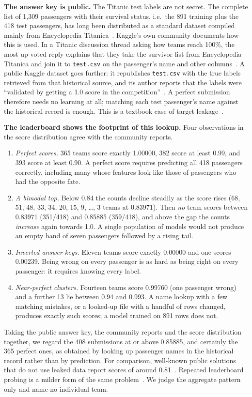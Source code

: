\documentclass[10pt,twocolumn,letterpaper]{article}
\begin{document}
\textbf{The answer key is public.} The Titanic test labels are not secret. The complete list of 1{,}309 passengers with their survival status, i.e.\ the 891 training plus the 418 test passengers, has long been distributed as a standard dataset compiled mainly from Encyclopedia Titanica~\cite{openml,et}. Kaggle's own community documents how this is used. In a Titanic discussion thread asking how teams reach 100\%, the most up-voted reply explains that they take the survivor list from Encyclopedia Titanica and join it to \texttt{test.csv} on the passenger's name and other columns~\cite{kagglediscuss}. A public Kaggle dataset goes further: it republishes \texttt{test.csv} with the true labels retrieved from that historical source, and its author reports that the labels were ``validated by getting a 1.0 score in the competition''~\cite{howe}. A perfect submission therefore needs no learning at all; matching each test passenger's name against the historical record is enough. This is a textbook case of target leakage~\cite{kaufman2012}.

\textbf{The leaderboard shows the footprint of this lookup.} Four observations in the score distribution agree with the community reports.
\begin{enumerate}
\item \emph{Perfect scores.} 365 teams score exactly 1.00000, 382 score at least 0.99, and 393 score at least 0.90. A perfect score requires predicting all 418 passengers correctly, including many whose features look like those of passengers who had the opposite fate.
\item \emph{A bimodal top.} Below 0.84 the counts decline steadily as the score rises (68, 51, 48, 33, 34, 20, 15, 9, \dots, 3 teams at 0.83971). Then \emph{no} team scores between 0.83971 (351/418) and 0.85885 (359/418), and above the gap the counts \emph{increase} again towards 1.0. A single population of models would not produce an empty band of seven passengers followed by a rising tail.
\item \emph{Inverted answer keys.} Eleven teams score exactly 0.00000 and one scores 0.00239. Being wrong on every passenger is as hard as being right on every passenger: it requires knowing every label.
\item \emph{Near-perfect clusters.} Fourteen teams score 0.99760 (one passenger wrong) and a further 13 lie between 0.94 and 0.993. A name lookup with a few matching mistakes, or a looked-up file with a handful of rows changed, produces exactly such scores; a model trained on 891 rows does not.
\end{enumerate}
Taking the public answer key, the community reports and the score distribution together, we regard the 408 submissions at or above 0.85885, and certainly the 365 perfect ones, as obtained by looking up passenger names in the historical record rather than by prediction. For comparison, well-known public solutions that do not use leaked data report scores of around 0.81~\cite{besbes}. Repeated leaderboard probing is a milder form of the same problem~\cite{blum2015}. We judge the aggregate pattern only and name no individual team.
\end{document}
